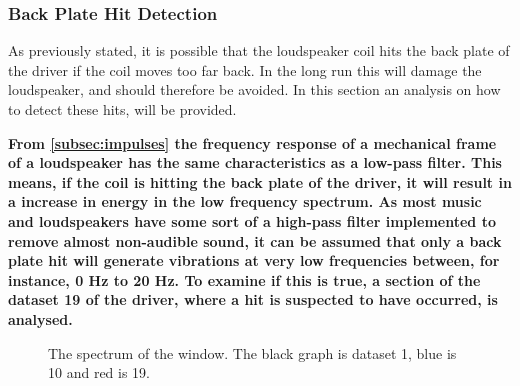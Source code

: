 \subsubsection{Back Plate Hit Detection}\label{sec:hit_detect}
As previously stated, it is possible that the loudspeaker coil hits the back plate of the driver if the coil moves too far back. In the long run this will damage the loudspeaker, and should therefore be avoided. In this section an analysis on how to detect these hits, will be provided. 

\textbf{From \autoref{subsec:impulses} the frequency response of a mechanical frame of a loudspeaker has the same characteristics as a low-pass filter. This means, if the coil is hitting the back plate of the driver, it will result in a increase in energy in the low frequency spectrum. As most music and loudspeakers have some sort of a high-pass filter implemented to remove almost non-audible sound, it can be assumed that only a back plate hit will generate vibrations at very low frequencies between, for instance, 0 Hz to 20 Hz. To examine if this is true, a section of the dataset 19 of the driver, where a hit is suspected to have occurred, is analysed.} %


%	
%	


\begin{figure}[H]
\centering
{}

\label{fig:FFT_hit}
\caption{The spectrum of the window. The black graph is dataset 1, blue is 10 and red is 19.}
\label{fig:FFT_hit}
\end{figure}

